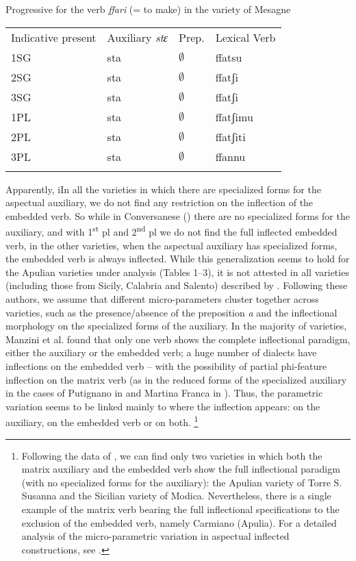 \documentclass[output=paper]{langsci/langscibook}
\begin{document}
\begin{table}
\caption{Progressive for the verb \textit{ffari} (= to make) in the variety of Mesagne}
\label{tab:4}
\end{table}

\begin{tabularx}{\textwidth}{XXXX}
\lsptoprule
Indicative present & Auxiliary \textit{stɛ} & Prep. & Lexical Verb\\
1SG & sta & ${\emptyset}$ & ffatsu\\
2SG & sta & ${\emptyset}$ & ffatʃi\\
3SG & sta & ${\emptyset}$ & ffatʃi\\
1PL & sta & ${\emptyset}$ & ffatʃimu\\
2PL & sta & ${\emptyset}$ & ffatʃiti\\
3PL & sta & ${\emptyset}$ & ffannu\\
\lspbottomrule
\end{tabularx}
Apparently, iIn all the varieties in which there are specialized forms for the aspectual auxiliary, we do not find any restriction on the inflection of the embedded verb. So while in Conversanese () there are no specialized forms for the auxiliary, and with 1\textsuperscript{st} pl and 2\textsuperscript{nd} pl we do not find the full inflected embedded verb, in the other varieties, when the aspectual auxiliary has specialized forms, the embedded verb is always inflected. While this generalization seems to hold for the Apulian varieties under analysis (Tables 1–3), it is not attested in all varieties (including those from Sicily, Calabria and Salento) described by \citet{ManziniEtAl2017}. Following these authors, we assume that different micro{}-parameters cluster together across varieties, such as the presence/absence of the preposition \textit{a} and the inflectional morphology on the specialized forms of the auxiliary. In the majority of varieties, Manzini et al. found that only one verb shows the complete inflectional paradigm, either the auxiliary or the embedded verb; a huge number of dialects have inflections on the embedded verb – with the possibility of partial phi{}-feature inflection on the matrix verb (as in the reduced forms of the specialized auxiliary in the cases of Putignano in  and Martina Franca in ). Thus, the parametric variation seems to be linked mainly to where the inflection appears: on the auxiliary, on the embedded verb or on both. \footnote{Following the data of \citet{ManziniEtAl2017}, we can find only two varieties in which both the matrix auxiliary and the embedded verb show the full inflectional paradigm (with no specialized forms for the auxiliary): the Apulian variety of Torre S. Susanna and the Sicilian variety of Modica. Nevertheless, there is a single example of the matrix verb bearing the full inflectional specifications to the exclusion of the embedded verb, namely Carmiano (Apulia). For a detailed analysis of the micro-parametric variation in aspectual inflected constructions, see \citet{ManziniEtAl2017}.} 
\end{document}
